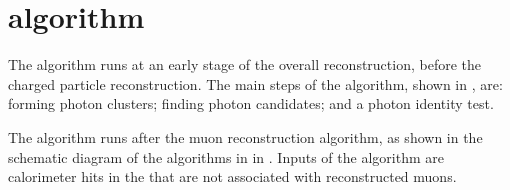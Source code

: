 



\section{\PhotonReconstruction algorithm}
\label{sec:photonRecostrcution}


The \PhotonReconstruction algorithm runs at an early stage of the overall reconstruction, before the charged particle reconstruction.  The main steps of the \PhotonReconstruction algorithm, shown in , are:  forming photon clusters; finding photon candidates; and a photon identity test. 

The \PhotonReconstruction algorithm runs after the muon reconstruction algorithm, as shown in the schematic diagram of the algorithms in \pandora in . Inputs of the \PhotonReconstruction algorithm are calorimeter hits in the \ECAL that are not associated with reconstructed muons.



